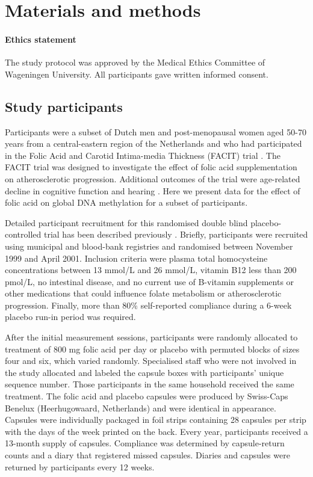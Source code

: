\section[]{Materials and methods} %

\paragraph*{Ethics statement} 
The study protocol was approved by the Medical Ethics Committee of Wageningen University. All participants gave written informed consent.

\subsection{Study participants} %
\noindent Participants were a subset of Dutch men and post-menopausal women aged 50-70 years from a central-eastern region of the Netherlands and who had participated in the Folic Acid and Carotid Intima-media Thickness (FACIT) trial \cite{c416}. The FACIT trial was designed to investigate the effect of folic acid supplementation on atherosclerotic progression. Additional outcomes of the trial were age-related decline in cognitive function and hearing \cite{c417,c418,c419}. Here we present data for the effect of folic acid on global DNA methylation for a subset of participants.

\noindent Detailed participant recruitment for this randomised double blind placebo-controlled trial has been described previously \cite{c417}. Briefly, participants were recruited using municipal and blood-bank registries and randomised between November 1999 and April 2001. Inclusion criteria were plasma total homocysteine concentrations between 13 mmol/L and 26 mmol/L, vitamin B12 less than 200 pmol/L, no intestinal disease, and no current use of B-vitamin supplements or other medications that could influence folate metabolism or atherosclerotic progression. Finally, more than 80\% self-reported compliance during a 6-week placebo run-in period was required.

\noindent After the initial measurement sessions, participants were randomly allocated to treatment of 800 mg folic acid per day or placebo with permuted blocks of sizes four and six, which varied randomly. Specialised staff who were not involved in the study allocated and labeled the capsule boxes with participants' unique sequence number. Those participants in the same household received the same treatment. The folic acid and placebo capsules were produced by Swiss-Caps Benelux (Heerhugowaard, Netherlands) and were identical in appearance. Capsules were individually packaged in foil strips containing 28 capsules per strip with the days of the week printed on the back. Every year, participants received a 13-month supply of capsules. Compliance was determined by capsule-return counts and a diary that registered missed capsules. Diaries and capsules were returned by participants every 12 weeks.

